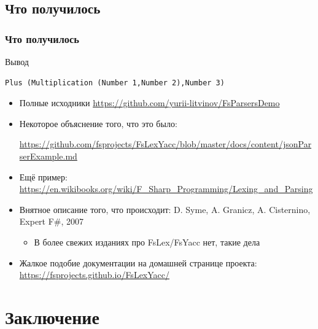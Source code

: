 \documentclass{../../slides-style}
\begin{document}
    \subsection{Что получилось}

    \begin{frame}[fragile]
        \frametitle{Что получилось}
        \begin{exampleblock}{Вывод}
            \begin{verbatim}
Plus (Multiplication (Number 1,Number 2),Number 3)
            \end{verbatim}
        \end{exampleblock}
        \begin{itemize}
            \item Полные исходники \url{https://github.com/yurii-litvinov/FsParsersDemo}
            \item Некоторое объяснение того, что это было:
            
                \url{https://github.com/fsprojects/FsLexYacc/blob/master/docs/content/jsonParserExample.md}
            \item Ещё пример: \url{https://en.wikibooks.org/wiki/F_Sharp_Programming/Lexing_and_Parsing}
            \item Внятное описание того, что происходит: D. Syme, A. Granicz, A. Cisternino, Expert F\#, 2007
            \begin{itemize}
                \item В более свежих изданиях про FsLex/FsYacc нет, такие дела
            \end{itemize}
            \item Жалкое подобие документации на домашней странице проекта: \url{https://fsprojects.github.io/FsLexYacc/}
        \end{itemize}
    \end{frame}

    \section{Заключение}
\end{document}
